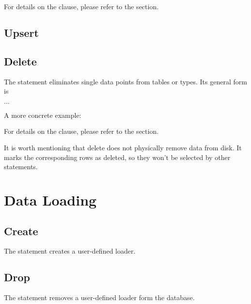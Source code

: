 For details on the  clause,
please refer to the  section.


\subsection{Upsert}

\subsection{Delete}
The  statement eliminates single
data points from tables or types.
Its general form is

   $\dots$

A more concrete example:

 
 

For details on the  clause,
please refer to the  section.

It is worth mentioning that delete
does not physically remove data from disk.
It marks the corresponding rows as deleted,
so they won't be selected by other statements.


\section{Data Loading}
\subsection{Create}
The  statement creates a user-defined loader.


\subsection{Drop}
The  statement removes a user-defined loader
form the database.

